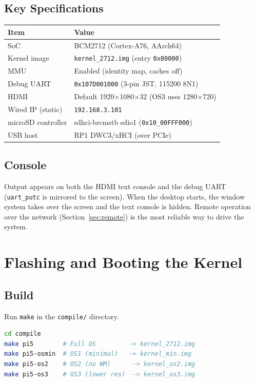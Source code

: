 \documentclass[a4paper,11pt]{article}
\begin{document}
\subsection{Key Specifications}
\begin{longtable}{ll}
\hline
Item & Value \\
\hline
SoC & BCM2712 (Cortex-A76, AArch64) \\
Kernel image & \texttt{kernel\_2712.img} (entry \texttt{0x80000}) \\
MMU & Enabled (identity map, caches off) \\
Debug UART & \texttt{0x107D001000} (3-pin JST, 115200 8N1) \\
HDMI & Default 1920$\times$1080$\times$32 (OS3 uses 1280$\times$720) \\
Wired IP (static) & \texttt{192.168.3.101} \\
microSD controller & sdhci-brcmstb sdio1 (\texttt{0x10\_00FFF000}) \\
USB host & RP1 DWC3/xHCI (over PCIe) \\
\hline
\end{longtable}

\subsection{Console}
Output appears on both the HDMI text console and the debug UART
(\texttt{uart\_putc} is mirrored to the screen). When the desktop starts,
the window system takes over the screen and the text console is hidden.
Remote operation over the network (Section~\ref{sec:remote}) is the most
reliable way to drive the system.

\section{Flashing and Booting the Kernel}

\subsection{Build}
Run \texttt{make} in the \texttt{compile/} directory.

\begin{lstlisting}[language=bash]
cd compile
make pi5        # Full OS         -> kernel_2712.img
make pi5-osmin  # OS1 (minimal)   -> kernel_min.img
make pi5-os2    # OS2 (no WM)      -> kernel_os2.img
make pi5-os3    # OS3 (lower res)  -> kernel_os3.img
\end{lstlisting}
\end{document}
